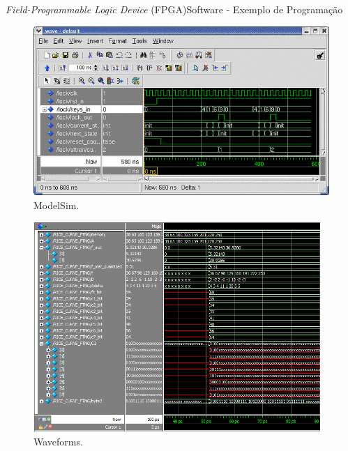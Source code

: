     	\begin{frame}{\textit{Field-Programmable Logic Device} (FPGA)}{Software - Exemplo de Programação}
            \vspace{-0.5em}
    		\begin{figure}[p]
    			\centering
    			\includegraphics[width=1\textwidth]{img/fpga/modelsim.png}
                \vspace{-0.5em}
    			\caption{ModelSim.}
    			\label{fig:modelsim}
    		\end{figure}
    	\end{frame}
    
    \begin{frame}%
    \vspace{-0.6em}
    \begin{figure}[p]
        \centering
        \includegraphics[width=0.97\textwidth]{img/fpga/waveform.png}
        \vspace{-0.6em}
        \caption{Waveforms.}
        \label{fig:waveform}
    \end{figure}
    \end{frame}
    
